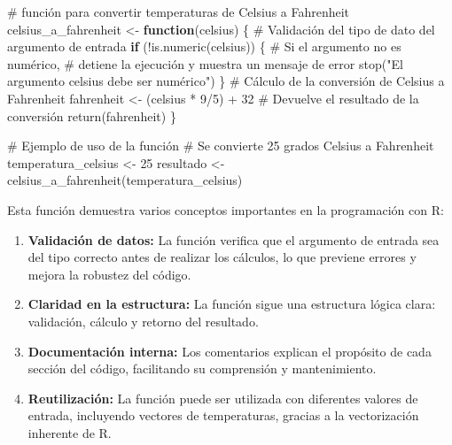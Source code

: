\documentclass[
  spanish,
  a4paper,
  DIV=11,
  numbers=noendperiod,
  onepage,
  openany]{scrreprt}
\newenvironment{Shaded}{\begin{snugshade}}{\end{snugshade}}
\newcommand{\CommentTok}[1]{\textcolor[rgb]{0.37,0.37,0.37}{#1}}
\newcommand{\ControlFlowTok}[1]{\textcolor[rgb]{0.00,0.23,0.31}{\textbf{#1}}}
\newcommand{\DecValTok}[1]{\textcolor[rgb]{0.68,0.00,0.00}{#1}}
\newcommand{\FunctionTok}[1]{\textcolor[rgb]{0.28,0.35,0.67}{#1}}
\newcommand{\NormalTok}[1]{\textcolor[rgb]{0.00,0.23,0.31}{#1}}
\newcommand{\OtherTok}[1]{\textcolor[rgb]{0.00,0.23,0.31}{#1}}
\newcommand{\SpecialCharTok}[1]{\textcolor[rgb]{0.37,0.37,0.37}{#1}}
\newcommand{\StringTok}[1]{\textcolor[rgb]{0.13,0.47,0.30}{#1}}
\begin{document}
\begin{Shaded}
\begin{Highlighting}[]
\CommentTok{\# función para convertir temperaturas de Celsius a Fahrenheit}
\NormalTok{celsius\_a\_fahrenheit }\OtherTok{\textless{}{-}} \ControlFlowTok{function}\NormalTok{(celsius) \{}
    \CommentTok{\# Validación del tipo de dato del argumento de entrada}
    \ControlFlowTok{if}\NormalTok{ (}\SpecialCharTok{!}\FunctionTok{is.numeric}\NormalTok{(celsius)) \{}
        \CommentTok{\# Si el argumento no es numérico, }
        \CommentTok{\# detiene la ejecución y muestra un mensaje de error }
        \FunctionTok{stop}\NormalTok{(}\StringTok{"El argumento \textquotesingle{}celsius\textquotesingle{} debe ser numérico"}\NormalTok{)}
\NormalTok{    \}}
    \CommentTok{\# Cálculo de la conversión de Celsius a Fahrenheit}
\NormalTok{    fahrenheit }\OtherTok{\textless{}{-}}\NormalTok{ (celsius }\SpecialCharTok{*} \DecValTok{9}\SpecialCharTok{/}\DecValTok{5}\NormalTok{) }\SpecialCharTok{+} \DecValTok{32}
    \CommentTok{\# Devuelve el resultado de la conversión}
    \FunctionTok{return}\NormalTok{(fahrenheit)}
\NormalTok{\}}

\CommentTok{\# Ejemplo de uso de la función}
\CommentTok{\# Se convierte 25 grados Celsius a Fahrenheit}
\NormalTok{temperatura\_celsius }\OtherTok{\textless{}{-}} \DecValTok{25}
\NormalTok{resultado }\OtherTok{\textless{}{-}} \FunctionTok{celsius\_a\_fahrenheit}\NormalTok{(temperatura\_celsius)}
\end{Highlighting}
\end{Shaded}

Esta función demuestra varios conceptos importantes en la programación
con R:

\begin{enumerate}
\def\labelenumi{\arabic{enumi}.}
\item
  \textbf{Validación de datos:} La función verifica que el argumento de
  entrada sea del tipo correcto antes de realizar los cálculos, lo que
  previene errores y mejora la robustez del código.
\item
  \textbf{Claridad en la estructura:} La función sigue una estructura
  lógica clara: validación, cálculo y retorno del resultado.
\item
  \textbf{Documentación interna:} Los comentarios explican el propósito
  de cada sección del código, facilitando su comprensión y
  mantenimiento.
\item
  \textbf{Reutilización:} La función puede ser utilizada con diferentes
  valores de entrada, incluyendo vectores de temperaturas, gracias a la
  vectorización inherente de R.
\end{enumerate}
\end{document}

